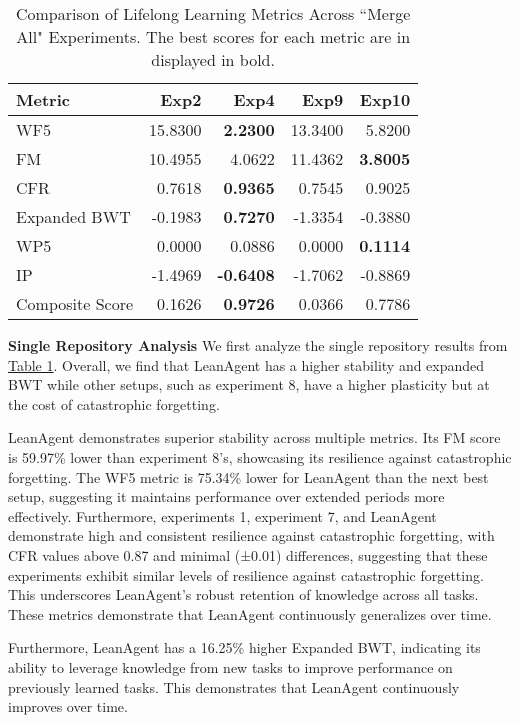 \documentclass{article} %
\begin{document}
\begin{table}
\caption{Comparison of Lifelong Learning Metrics Across ``Merge All" Experiments. The best scores for each metric are in displayed in bold.}
\label{tab:merge-all-experiment-metrics}
\centering
\begin{tabular}{lrrrr}
\hline
Metric & Exp2 & Exp4 & Exp9 & Exp10 \\
\hline
WF5 & 15.8300 & \textbf{2.2300} & 13.3400 & 5.8200 \\
FM & 10.4955 & 4.0622 & 11.4362 & \textbf{3.8005} \\
CFR & 0.7618 & \textbf{0.9365} & 0.7545 & 0.9025 \\
Expanded BWT & -0.1983 & \textbf{0.7270} & -1.3354 & -0.3880 \\
WP5 & 0.0000 & 0.0886 & 0.0000 & \textbf{0.1114} \\
IP & -1.4969 & \textbf{-0.6408} & -1.7062 & -0.8869 \\
\hline
Composite Score & 0.1626 & \textbf{0.9726} & 0.0366 & 0.7786 \\
\hline
\end{tabular}
\end{table}

\textbf{Single Repository Analysis} We first analyze the single repository results from \hyperref[tab:experiment-metrics]{Table 1}. Overall, we find that LeanAgent has a higher stability and expanded BWT while other setups, such as experiment 8, have a higher plasticity but at the cost of catastrophic forgetting.

LeanAgent demonstrates superior stability across multiple metrics. Its FM score is 59.97\% lower than experiment 8's, showcasing its resilience against catastrophic forgetting. The WF5 metric is 75.34\% lower for LeanAgent than the next best setup, suggesting it maintains performance over extended periods more effectively. Furthermore, experiments 1, experiment 7, and LeanAgent demonstrate high and consistent resilience against catastrophic forgetting, with CFR values above 0.87 and minimal (±0.01) differences, suggesting that these experiments exhibit similar levels of resilience against catastrophic forgetting. This underscores LeanAgent's robust retention of knowledge across all tasks. These metrics demonstrate that LeanAgent continuously generalizes over time.

Furthermore, LeanAgent has a 16.25\% higher Expanded BWT, indicating its ability to leverage knowledge from new tasks to improve performance on previously learned tasks. This demonstrates that LeanAgent continuously improves over time.
\end{document}
